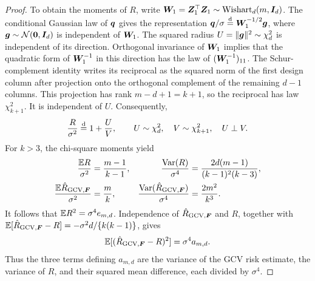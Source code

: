 \documentclass{article}
\theoremstyle{plain} %
\theoremstyle{definition} %
\theoremstyle{definition} %
\newcommand{\GCV}{{\text{GCV}}}
\newcommand{\hR}{\hat{R}}
\begin{document}
\begin{proof}
To obtain the moments of $R$, write
$\boldsymbol{W}_1=\boldsymbol{Z}_1^\top\boldsymbol{Z}_1\sim\operatorname{Wishart}_d(m,\boldsymbol{I}_d)$.
The conditional Gaussian law of $\boldsymbol{q}$ gives the representation
$\boldsymbol{q}/\sigma\stackrel{\rm d}{=}\boldsymbol{W}_1^{-1/2}\boldsymbol{g}$, where
$\boldsymbol{g}\sim{\mathcal N}(\mathbf{0},\boldsymbol{I}_d)$ is independent of $\boldsymbol{W}_1$.
The squared radius $U=\lVert\boldsymbol{g}\rVert^2\sim\chi^2_d$ is independent of its
direction. Orthogonal invariance of $\boldsymbol{W}_1$ implies that the quadratic
form of $\boldsymbol{W}_1^{-1}$ in this direction has the law of
$(\boldsymbol{W}_1^{-1})_{11}$. The Schur-complement identity writes its reciprocal
as the squared norm of the first design column after projection onto the
orthogonal complement of the remaining $d-1$ columns. This projection has
rank $m-d+1=k+1$, so the reciprocal has law $\chi^2_{k+1}$.
It is independent of $U$. Consequently,
\begin{align*}
    \frac{R}{\sigma^2}\stackrel{\rm d}{=}1+\frac UV,
    \qquad U\sim\chi^2_d,\quad V\sim\chi^2_{k+1},
    \quad U\perp V.
\end{align*}
For $k>3$, the chi-square moments yield
\begin{align*}
    \frac{\E R}{\sigma^2}&=\frac{m-1}{k-1},
    &\frac{\operatorname{Var}(R)}{\sigma^4}
       &=\frac{2d(m-1)}{(k-1)^2(k-3)},\\
    \frac{\E\hR_{\GCV,\bF}}{\sigma^2}&=\frac mk,
    &\frac{\operatorname{Var}(\hR_{\GCV,\bF})}{\sigma^4}
       &=\frac{2m^2}{k^3}.
\end{align*}
It follows that ${\mathbb{E}} R^2=\sigma^4e_{m,d}$. Independence of
$\hR_{\GCV,\bF}$ and $R$, together with
$\E[\hR_{\GCV,\bF}-R]=-\sigma^2d/\{k(k-1)\}$, gives
\begin{align*}
    \E[(\hR_{\GCV,\bF}-R)^2]=\sigma^4a_{m,d}.
\end{align*}
Thus the three terms defining $a_{m,d}$ are the variance of the GCV risk
estimate, the variance of $R$, and their squared mean difference, each
divided by $\sigma^4$.


\end{proof}
\end{document}

